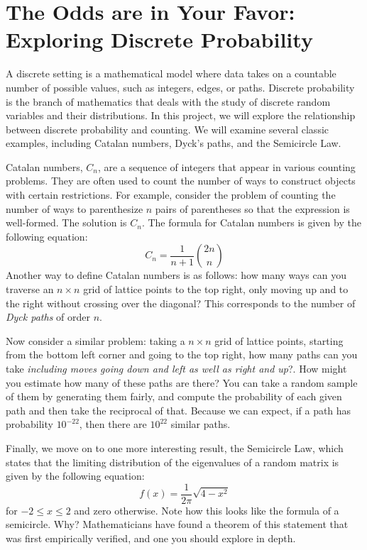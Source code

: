 \documentclass{article}
\begin{document}
\pagebreak

\section{The Odds are in Your Favor: Exploring Discrete Probability}
    A discrete setting is a mathematical model where data takes on a countable number of possible values, such as integers, edges, or paths. Discrete probability is the branch of mathematics that deals with the study of discrete random variables and their distributions. In this project, we will explore the relationship between discrete probability and counting. We will examine several classic examples, including Catalan numbers, Dyck's paths, and the Semicircle Law.
    
    \vspace{3mm}
    Catalan numbers, $C_{n}$, are a sequence of integers that appear in various counting problems. They are often used to count the number of ways to construct objects with certain restrictions. For example, consider the problem of counting the number of ways to parenthesize $n$ pairs of parentheses so that the expression is well-formed. The solution is $C_{n}$. The formula for Catalan numbers is given by the following equation:
    $$C_{n} = \frac{1}{n+1}\binom{2n}{n}$$ Another way to define Catalan numbers is as follows: how many ways can you traverse an $n \times n$ grid of lattice points to the top right, only moving up and to the right without crossing over the diagonal? This corresponds to the number of \textit{Dyck paths} of order $n$.

    \vspace{2mm}
    Now consider a similar problem: taking a $n \times n$ grid of lattice points, starting from the bottom left corner and going to the top right, how many paths can you take \textit{including moves going down and left as well as right and up}?. How might you estimate how many of these paths are there? You can take a random sample of them by generating them fairly, and compute the probability of each given path and then take the reciprocal of that. Because we can expect, if a path has probability $10^{-22}$, then there are $10^{22}$ similar paths.
    
    \vspace{3mm}
    Finally, we move on to one more interesting result, the Semicircle Law, which states that the limiting distribution of the eigenvalues of a random matrix is given by the following equation:
    $$f(x) = \frac{1}{2\pi}\sqrt{4 - x^{2}}$$
    for $-2 \le x \le 2$ and zero otherwise. Note how this looks like the formula of a semicircle. Why? Mathematicians have found a theorem of this statement that was first empirically verified, and one you should explore in depth.
    
\end{document}

